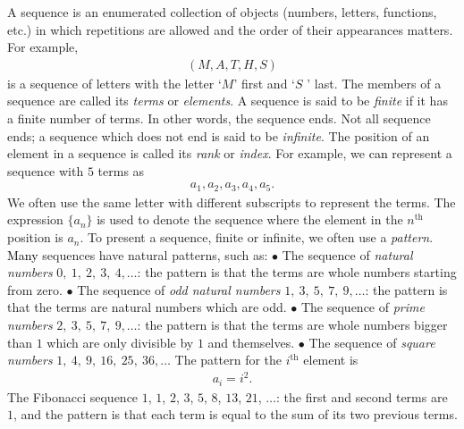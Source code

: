\vspace*{30pt}
\newcommand{\edit}[1]{\textcolor{black}{#1}}
\begin{multicols}{2}
	\setlength{\abovedisplayskip}{4pt}
	\setlength{\belowdisplayskip}{4pt}
	A sequence is an enumerated collection of objects (numbers, letters, functions, etc.) in which repetitions are allowed and the order of their appearances matters. For example, 
	\begin{align*}
		(M, A, T, H, S)
	\end{align*}
	is a sequence of letters with the letter `$M$' first and `$S$ ' last.
	\vskip 0.05cm
	The members of a sequence are called its \textit{terms} or \textit{elements}.
	A sequence is said to be \textit{finite} if it has a finite number of terms. 
	In other words, the sequence ends. Not all sequence ends; a sequence which does not end is said to be \textit{infinite}.
	\vskip 0.05cm
	The position of an element in a sequence is called its {\em rank} or {\em  index}. For example, we \edit{can} represent a sequence with $5$ terms as 
	\begin{align*}
		a_1, a_2, a_3, a_4, a_5.
	\end{align*}
	We often use the same letter with different subscripts to represent the terms.
	The expression $\{a_n\}$ is used to denote the sequence
	where the element in the $n^\textrm{th}$ position is $a_n$.
	\vskip 0.05cm
	To present a sequence, finite or infinite, we often use a {\em pattern}.
	\edit{Many} sequences have natural patterns, such as:
	\vskip 0.05cm
	$\bullet$ The sequence of {\em natural numbers} $0,\ 1,\ 2,\ 3,\ 4, \ldots$: the pattern is that the terms are whole numbers starting from zero.
	\vskip 0.05cm
	$\bullet$ The sequence of {\em odd natural numbers} $1,\ 3,\ 5,\ 7,\ 9, \ldots$: the pattern is that the terms are natural numbers which are odd.
	\vskip 0.05cm	
	$\bullet$ The sequence of {\em prime numbers} $2,\ 3,\ 5,\ 7,\ 9, \ldots$: the pattern is that the terms are whole numbers bigger than $1$ which are only divisible by $1$ and themselves.
	\vskip 0.05cm
	$\bullet$ The sequence of {\em square numbers} $1,\ 4,\ 9,\ 16,\ 25,\ 36, \ldots$ The pattern for the $i^{\textrm{th}}$ element is 
	\begin{align*}
		a_i = i^2.
	\end{align*}
	The Fibonacci sequence $1$, $1$, $2$, $3$, $5$, $8$, $13$, \linebreak $21$, $\ldots$: the first and second terms are $1$, and the pattern is that each term is equal to the sum of its two previous terms.
	\vskip 0.05cm

\end{multicols}
